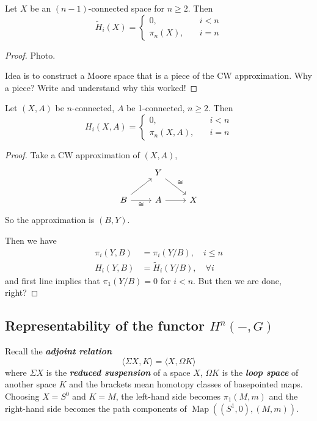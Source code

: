 \documentclass{article}
\DeclareMathOperator{\Map}{Map}
\begin{document}
\begin{thm}[Hurewicz]
	Let $X$ be an $(n-1)$-connected space for $n\geq 2$. Then
	\[\tilde{H}_i(X)=\begin{cases}
		0,\quad&i<n\\
		\pi_n(X),\quad&i=n
	\end{cases}\]
\end{thm}
\begin{proof}
	Photo.
	
	Idea is to construct a Moore space that is {\color{red}a piece of the CW approximation}. {\color{persiangreen}Why a piece? Write and understand why this worked!}
\end{proof}
\begin{thm}
	Let $(X,A)$ be $n$-connected, $A$ be 1-connected, $n\geq2$. Then
		\[H_i(X,A)=\begin{cases}
		0,\quad&i<n\\
		\pi_n(X,A),\quad&i=n
	\end{cases}\]
\end{thm}
\begin{proof}
	Take a CW approximation of $(X,A)$,
	\[\begin{tikzcd}
		&Y\arrow[dr,"\cong"]\\
		B\arrow[ur]\arrow[r,swap,"\cong"]&A\arrow[r]&X
	\end{tikzcd}\]
	So the approximation is $(B,Y)$.
	
	Then we have
	\begin{align*}
		\pi_i(Y,B)&=\pi_i(Y/B),\quad i\leq n\\
		H_i(Y,B)&=\tilde{H}_i(Y/B),\quad \forall i
	\end{align*}
	and first line implies that $\pi_1(Y/B)=0$ for $i<n$. But then we are done, right?
\end{proof}

\subsection{Representability of the functor $H^n(-,G)$}

\begin{remark}
	Recall the \textbf{\textit{adjoint relation}}
\[\langle \Sigma X,K\rangle=\langle X,\Omega K\rangle\]
where $\Sigma X$ is the \textbf{\textit{reduced suspension}} of a space $X$, $\Omega K$ is the \textbf{\textit{loop space}} of another space $K$ and the brackets mean homotopy classes of basepointed maps. Choosing $X=S^0$ and $K=M$, the left-hand side becomes $\pi_1(M,m)$ and the right-hand side becomes the path components of $\Map((S^1,0),(M,m))$.
\end{remark}
\end{document}
